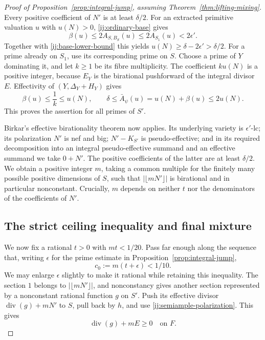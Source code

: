 \begin{proof}[Proof of Proposition~\ref{prop:integral-jump}, assuming
Theorem~\ref{thm:lifting-mixing}]
Every positive coefficient of $N'$ is at least $\delta/2$.
For an extracted primitive valuation $u$ with $u(N)>0$,
\eqref{ij:ordinary-base} gives
\[
 \beta(u)\le2A_{S,B_S}(u)
 \le2A_{S_1}(u)<2\epsilon'.
\]
Together with \eqref{ij:base-lower-bound} this yields
$u(N)\ge\delta-2\epsilon'>\delta/2$.
For a prime already on $S_1$, use its corresponding prime on $S$.
Choose a prime of $Y$ dominating it, and let $k\ge1$ be its fibre
multiplicity.  The coefficient $k u(N)$ is a positive integer,
because $E_Y$ is the birational pushforward of the integral
divisor $E$.  Effectivity of $(Y,\Delta_Y+H_Y)$ gives
\[
 \beta(u)\le\frac1k\le u(N),
 \qquad
 \delta\le\bar A_\psi(u)=u(N)+\beta(u)\le2u(N).
\]
This proves the assertion for all primes of $S'$.

Birkar's effective birationality theorem
\cite[Theorem~4.2]{BirkarPolarised} now applies.
Its underlying variety is $\epsilon'$-lc; its polarization $N'$
is nef and big; $N'-K_{S'}$ is pseudo-effective; and in its required
decomposition into an integral pseudo-effective summand and an
effective summand we take $0+N'$.  The positive coefficients of
the latter are at least $\delta/2$.  We obtain a positive integer
$m$, taking a common multiple for the finitely many possible
positive dimensions of $S$, such that $|\lfloor mN'\rfloor|$ is birational and in
particular nonconstant.  Crucially, $m$ depends on neither $t$ nor
the denominators of the coefficients of $N'$.

\subsection{The strict ceiling inequality and final mixture}

We now fix a rational $t>0$ with $mt<1/20$.
Pass far enough along the sequence that, writing $\epsilon$ for
the prime estimate in Proposition~\ref{prop:integral-jump},
\begin{equation}
\label{ij:strict-choice}
 c_0:=m(t+\epsilon)<1/10.
\end{equation}
We may enlarge $\epsilon$ slightly to make it rational while
retaining this inequality.
The section $1$ belongs to $|\lfloor mN'\rfloor|$, and
nonconstancy gives another section represented by a nonconstant
rational function $g$ on $S'$.  Push its effective divisor
$\operatorname{div}(g)+mN'$ to $S$, pull back by $h$, and use
\eqref{ij:semiample-polarization}.  This gives
\begin{equation}
\label{ij:g-bound-on-F}
 \operatorname{div}(g)+mE\ge0
 \quad\text{on }F.
\end{equation}


\end{proof}
